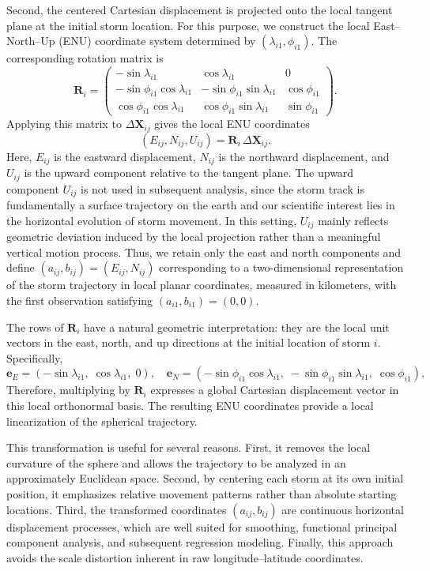 \documentclass{article}
\begin{document}
Second, the centered Cartesian displacement is projected onto the local tangent plane at the initial storm location. For this purpose, we construct the local East--North--Up (ENU) coordinate system determined by $(\lambda_{i1}, \phi_{i1})$. The corresponding rotation matrix is
\[
\mathbf{R}_i =
\begin{pmatrix}
-\sin\lambda_{i1} & \cos\lambda_{i1} & 0 \\
-\sin\phi_{i1}\cos\lambda_{i1} &
-\sin\phi_{i1}\sin\lambda_{i1} &
\cos\phi_{i1} \\
\cos\phi_{i1}\cos\lambda_{i1} &
\cos\phi_{i1}\sin\lambda_{i1} &
\sin\phi_{i1}
\end{pmatrix}.
\]
Applying this matrix to $\Delta \mathbf{X}_{ij}$ gives the local ENU
coordinates
\[
(E_{ij}, N_{ij}, U_{ij})
=
\mathbf{R}_i \, \Delta \mathbf{X}_{ij}.
\]
Here, $E_{ij}$ is the eastward displacement, $N_{ij}$ is the northward displacement, and $U_{ij}$ is the upward component relative to the tangent plane. The upward component $U_{ij}$ is not used in subsequent analysis, since the storm track is fundamentally a surface trajectory on the earth and our scientific interest lies in the horizontal evolution of storm movement. In this setting, $U_{ij}$ mainly reflects geometric deviation induced by the local projection rather than a meaningful vertical motion process. Thus, we retain only the east and north components and define $(a_{ij}, b_{ij}) = (E_{ij}, N_{ij})$ corresponding to a two-dimensional representation of the storm trajectory in local planar coordinates, measured in kilometers, with the first observation satisfying $(a_{i1}, b_{i1}) = (0,0)$.

The rows of $\mathbf{R}_i$ have a natural geometric interpretation: they are the local unit vectors in the east, north, and up directions at the initial location of storm $i$. Specifically,
\[
\mathbf{e}_{E} = (-\sin\lambda_{i1},\; \cos\lambda_{i1},\; 0),
\quad
\mathbf{e}_{N} = (-\sin\phi_{i1}\cos\lambda_{i1},\; -\sin\phi_{i1}\sin\lambda_{i1},\; \cos\phi_{i1}),
\]
Therefore, multiplying by $\mathbf{R}_i$ expresses a global Cartesian displacement vector in this local orthonormal basis. The resulting ENU coordinates provide a local linearization of the spherical trajectory.

This transformation is useful for several reasons. First, it removes the local curvature of the sphere and allows the trajectory to be analyzed in an approximately Euclidean space. Second, by centering each storm at its own initial position, it emphasizes relative movement patterns rather than absolute starting locations. Third, the transformed coordinates $(a_{ij}, b_{ij})$ are continuous horizontal displacement processes, which are well suited for smoothing, functional principal component analysis, and subsequent regression modeling. Finally, this approach avoids the scale distortion inherent in raw longitude--latitude coordinates.
\end{document}
